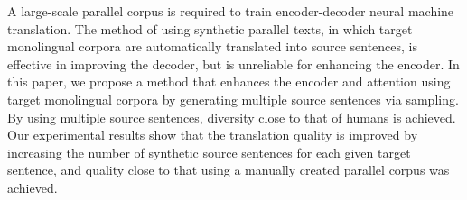 A large-scale parallel corpus is required to train encoder-decoder neural machine translation. The method of using synthetic parallel texts, in which target monolingual corpora are automatically translated into source sentences, is effective in improving the decoder, but is unreliable for enhancing the encoder. In this paper, we propose a method that enhances the encoder and attention using target monolingual corpora by generating multiple source sentences via sampling. By using multiple source sentences, diversity close to that of humans is achieved. Our experimental results show that the translation quality is improved by increasing the number of synthetic source sentences for each given target sentence, and quality close to that using a manually created parallel corpus was achieved.
